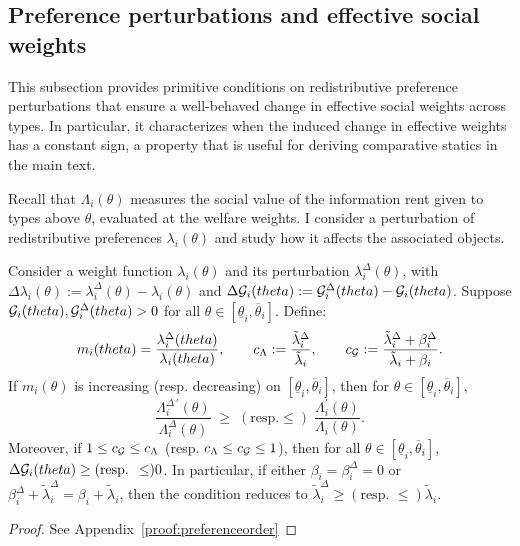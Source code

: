 \documentclass{class}
\begin{document}
\subsection{Preference perturbations and effective social weights}\label{app:preferenceorder}

This subsection provides primitive conditions on redistributive preference perturbations that ensure a well-behaved change in effective social weights across types. In particular, it characterizes when the induced change in effective weights has a constant sign, a property that is useful for deriving comparative statics in the main text.

Recall that $\Lambda_i(\theta)$ measures the social value of the information rent given to types above $\theta$, evaluated at the welfare weights. I consider a perturbation of redistributive preferences $\lambda_i(\theta)$ and study how it affects the associated objects.

\begin{lemma}\label{lem:preferenceorder}
Consider a weight function $\lambda_i(\theta)$ and its perturbation $\lambda_i^\Delta(\theta)$, with $\Delta\lambda_i(\theta):=\lambda_i^\Delta(\theta)-\lambda_i(\theta)$ and $\Delta\mathcal{G}_i(theta):=\mathcal{G}_i^\Delta(theta)-\mathcal{G}_i(theta)$. Suppose $\mathcal{G}_i(theta),\mathcal{G}_i^\Delta(theta)>0$ for all $\theta\in[\underline{\theta}_i,\overline{\theta}_i]$. Define:
\[
m_i(theta) = \frac{\lambda_i^\Delta(theta)}{\lambda_i(theta)}, \qquad c_\Lambda:=\frac{\tilde\lambda_i^\Delta}{\tilde\lambda_i},
\qquad
c_{\mathcal{G}}:=\frac{\tilde\lambda_i^\Delta+\beta_i^\Delta}
{\tilde\lambda_i+\beta_i}.
\]
If $m_i(\theta)$ is increasing (resp. decreasing) on $[\underline{\theta}_i,\overline{\theta}_i]$, then for $\theta\in[\underline{\theta}_i,\overline{\theta}_i]$,
\[
\frac{\Lambda_i^{\Delta\,\prime}(\theta)}{\Lambda_i^\Delta(\theta)} \;\ge\; (\text{resp.} \le) \; \frac{\Lambda_i^{\prime}(\theta)}{\Lambda_i(\theta)}.
\]
Moreover, if $1\le c_{\mathcal{G}}\le c_\Lambda$ (resp. $c_\Lambda\le c_{\mathcal{G}}\le 1$), then for all $\theta\in[\underline{\theta}_i,\overline{\theta}_i]$, $\Delta\mathcal{G}_i(theta)\ge(\text{resp. }\le)0$. In particular, if either $\beta_i=\beta_i^\Delta=0$ or $\beta_i^\Delta+\tilde\lambda_i^\Delta=\beta_i+\tilde\lambda_i$, then the condition reduces to $\tilde\lambda_i^\Delta\ge (\text{resp. }\le)\tilde\lambda_i$.
\end{lemma}
\begin{proof}
    See Appendix~\ref{proof:preferenceorder}
\end{proof}
\end{document}
